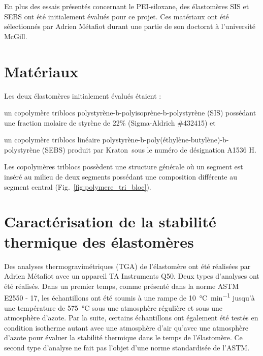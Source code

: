\label{sec:Annexe_A}

En plus des essais présentés concernant le PEI-siloxane, des élastomères SIS et SEBS ont été initialement évalués pour ce projet. 
Ces matériaux ont été sélectionnés par Adrien Métafiot durant une partie de son doctorat à l'université McGill. 

\section{Matériaux}

Les deux élastomères initialement évalués étaient : 
\begin{inparaenum}[]
	\item un copolymère triblocs polystyrène-b-polyisoprène-b-polystyrène (SIS) possédant une fraction molaire de styrène de 22\% (Sigma-Aldrich \#432415) et 
	\item un copolymère triblocs linéaire polystyrène-b-poly(éthylène-butylène)-b-polystyrène (SEBS) produit par Kraton\textregistered \ sous le numéro de désignation A1536 H. 
\end{inparaenum}
Les copolymères triblocs possèdent une structure générale où un segment est inséré au milieu de deux segments possédant une composition différente au segment central (Fig.~\ref{fig:polymere_tri_bloc}). 

\section{Caractérisation de la stabilité thermique des élastomères}

Des analyses thermogravimétriques (TGA) de l'élastomère ont été réalisées par Adrien Métafiot avec un appareil TA Instruments Q50. 
Deux types d'analyses ont été réalisés. 
Dans un premier temps, comme présenté dans la norme ASTM E2550 - 17, les échantillons ont été soumis à une rampe de \SI[locale=FR]{10}{\celsius\per\minute} jusqu'à une température de \SI[locale=FR]{575}{\celsius} sous une atmosphère régulière et sous une atmosphère d'azote. 
Par la suite, certains échantillons ont également été testés en condition isotherme autant avec une atmosphère d'air qu'avec une atmosphère d'azote pour évaluer la stabilité thermique dans le temps de l'élastomère. 
Ce second type d'analyse ne fait pas l'objet d'une norme standardisée de l'ASTM. 

